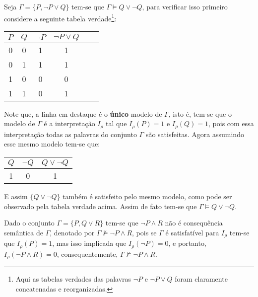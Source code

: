 \begin{exem}
    Seja $\Gamma = \{P, \neg P \lor Q \}$ tem-se que $\Gamma \vDash Q \lor \neg Q$, para verificar isso primeiro considere a seguinte tabela verdade\footnote{Aqui as tabelas verdades das palavras $\neg P$ e $\neg P \lor Q$ foram claramente concatenadas e reorganizadas.}:
    \begin{table*}[ht]
        \centering
        \scriptsize
        \begin{tabular}{|c|c|c|c|c|c|}
             \hline
             $P$ & $Q$ & $\neg P$ & $\neg P \lor Q $ \\ \hline
             0 & 0 & 1 & 1\\ \hline
             0 & 1 & 1 & 1\\  \hline
             1 & 0 & 0 & 0\\  \hline
             \rowcolor{cinzaClaro}
             1 & 1 & 0 & 1\\  \hline
        \end{tabular}
    \end{table*}
    
    Note que, a linha em destaque é o \textbf{único} modelo de $\Gamma$, isto é, tem-se que o modelo de $\Gamma$ é a interpretação $I_\rho$ tal que  $I_\rho(P) = 1$ e $I_\rho(Q) = 1$, pois com essa interpretação todas as palavras do conjunto $\Gamma$ são satisfeitas. Agora assumindo esse mesmo modelo tem-se que: 
    \begin{table*}[ht]
        \centering
        \scriptsize
        \begin{tabular}{|c|c|c|}
             \hline
             $Q$ & $\neg Q$ & $Q \lor \neg Q$ \\ \hline
             1 & 0 & 1 \\ \hline
        \end{tabular}
    \end{table*}
    
    E assim $\{Q \lor \neg Q\}$ também é satisfeito pelo mesmo modelo, como pode ser observado pela tabela verdade acima. Assim de fato tem-se que $\Gamma \vDash Q \lor \neg Q$.
\end{exem}

\begin{exem}
    Dado o conjunto $\Gamma = \{P, Q \lor R\}$ tem-se que $\neg P \land R$ não é consequência semântica de $\Gamma$, denotado por $\Gamma \not\vDash \neg P \land R$, pois se $\Gamma$ é satisfatível para $I_\rho$ tem-se que $I_\rho(P) = 1$, mas isso implicada que $I_\rho(\neg P) = 0$, e portanto, $I_\rho(\neg P \land R) = 0$, consequentemente, $\Gamma \not\vDash \neg P \land R$.
\end{exem}

